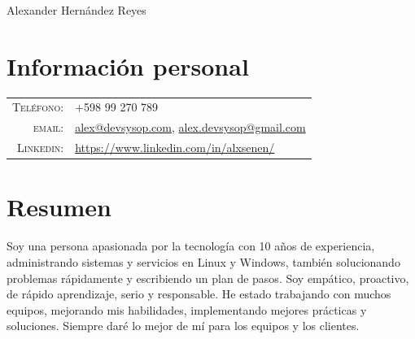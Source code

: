 \documentclass[a4paper,12pt]{article}
\begin{document}
\vspace*{-0.5cm}

\pagestyle{empty} %

{\huge Alexander Hern\'andez Reyes}
\hfill
{}\\
\section{Informaci\'on personal}
\begin{tabular}{rl}
    \textsc{Tel\'efono:}     & +598 99 270 789 \\
    \textsc{email:}     & \href{mailto:alex@devsysop.com}{alex@devsysop.com}, \href{mailto:alex.devsysop@gmail.com}{alex.devsysop@gmail.com} \\
    \textsc{Linkedin:}     & \href{https://www.linkedin.com/in/alxsenen/}{https://www.linkedin.com/in/alxsenen/} \\

\end{tabular}
\section{Resumen}
\justify
Soy una persona apasionada por la tecnología con 10 años de experiencia, administrando sistemas y servicios en Linux y Windows, también solucionando problemas rápidamente y escribiendo un plan de pasos. Soy empático, proactivo, de rápido aprendizaje, serio y responsable.
He estado trabajando con muchos equipos, mejorando mis habilidades, implementando mejores prácticas y soluciones. Siempre daré lo mejor de mí para los equipos y los clientes.

\end{document}
